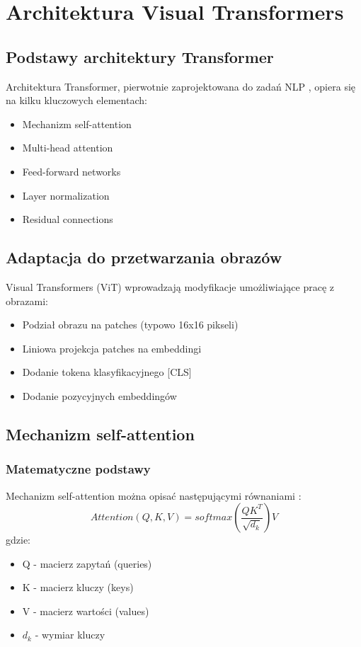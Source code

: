 \section{Architektura Visual Transformers}
\subsection{Podstawy architektury Transformer}
Architektura Transformer, pierwotnie zaprojektowana do zadań NLP \cite{vaswani2017attention}, opiera się na kilku kluczowych elementach:
\begin{itemize}
    \item Mechanizm self-attention
    \item Multi-head attention
    \item Feed-forward networks
    \item Layer normalization
    \item Residual connections
\end{itemize}

\subsection{Adaptacja do przetwarzania obrazów}
Visual Transformers (ViT) \cite{dosovitskiy2020image} wprowadzają modyfikacje umożliwiające pracę z obrazami:
\begin{itemize}
    \item Podział obrazu na patches (typowo 16x16 pikseli)
    \item Liniowa projekcja patches na embeddingi
    \item Dodanie tokena klasyfikacyjnego [CLS]
    \item Dodanie pozycyjnych embeddingów
\end{itemize}

\subsection{Mechanizm self-attention}
\subsubsection{Matematyczne podstawy}
Mechanizm self-attention można opisać następującymi równaniami \cite{vaswani2017attention}:
\begin{equation}
    Attention(Q,K,V) = softmax(\frac{QK^T}{\sqrt{d_k}})V
\end{equation}
gdzie:
\begin{itemize}
    \item Q - macierz zapytań (queries)
    \item K - macierz kluczy (keys)
    \item V - macierz wartości (values)
    \item $d_k$ - wymiar kluczy
\end{itemize}

